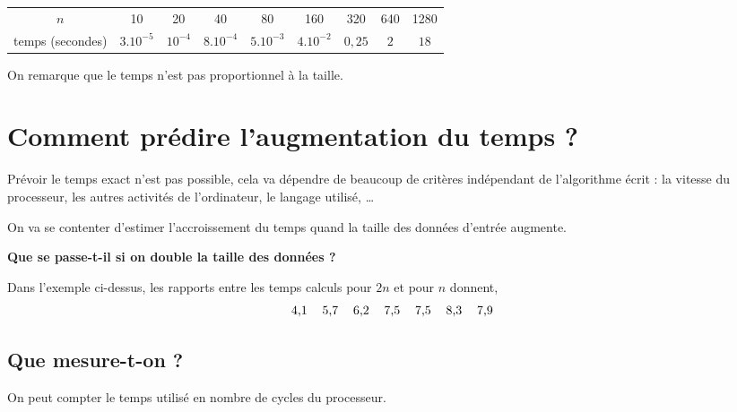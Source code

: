 \begin{itemize}
\begin{center}
\begin{tabular}{c|cccccccc}
$n$              & 10          &  20       & 40          & 80          & 160         & 320    & 640 & 1280 \\
temps (secondes) & $3.10^{-5}$ & $10^{-4}$ & $8.10^{-4}$ & $5.10^{-3}$ & $4.10^{-2}$ & $0,25$ & $2$ & $18$ \\
\end{tabular}
\end{center}

\end{itemize}
On remarque que le temps n'est pas proportionnel à la taille.
\section{Comment prédire l'augmentation du temps ?}
Prévoir le temps exact n'est pas possible, cela va dépendre de beaucoup de critères indépendant de l'algorithme écrit : la vitesse du processeur, les autres activités de l'ordinateur, le langage utilisé, \dots

On va se contenter d'estimer l'accroissement du temps quand la taille des données d'entrée augmente.

\begin{center}
{\bf Que se passe-t-il si on double la taille des données ?}
\end{center}

Dans l'exemple ci-dessus, les rapports entre les temps calculs pour $2n$ et pour $n$ donnent, 
\[\begin{tabular}{ccccccc}
4,1 & 5,7 & 6,2 & 7,5 & 7,5 & 8,3 & 7,9
\end{tabular}\]
\subsection{Que mesure-t-on ?}
On peut compter le temps utilisé en nombre de cycles du processeur.

